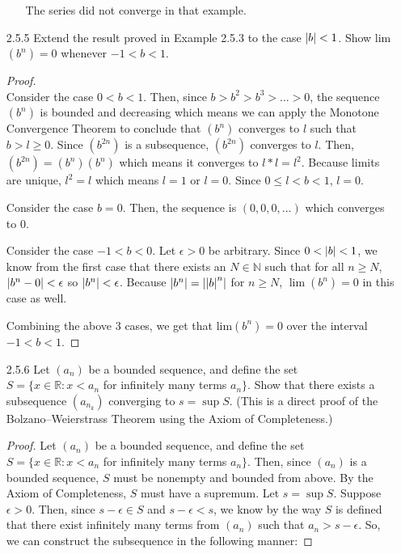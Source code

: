 \documentclass[12pt,letterpaper]{article}
\begin{document}
\begin{itemize}[leftmargin=!,labelindent=5pt]
\begin{itemize}
                The series did not converge in that example.
        \end{itemize}

    \item [2.5.5] Extend the result proved in Example 2.5.3 to the case $\abs{b} < 1$. Show lim$(b^n) = 0$ whenever $-1 < b < 1$.
        \begin{proof}\ \\
            Consider the case $0<b<1$.
            Then, since $b > b^2 > b^3 > ... > 0$, the sequence $(b^n)$ is bounded and decreasing which means we can apply the Monotone Convergence Theorem to conclude that $(b^n)$ converges to $l$ such that $b>l\geq 0$.
            Since $(b^{2n})$ is a subsequence, $(b^{2n})$ converges to $l$.
            Then, $(b^{2n}) = (b^n)(b^n)$ which means it converges to $l*l = l^2$.
            Because limits are unique, $l^2 = l$ which means $l = 1$ or $l=0$.
            Since $0 \leq l < b < 1$, $l = 0$.

            Consider the case $b = 0$.
            Then, the sequence is $(0,0, 0, ...)$ which converges to $0$.
            
            Consider the case $-1<b<0$.
            Let $\epsilon>0$ be arbitrary.
            Since $0<\abs{b} < 1$, we know from the first case that there exists an $N \in \mathbb{N}$ such that for all $n \geq N$, $\abs{b^n - 0} < \epsilon$ so $\abs{b^n} < \epsilon$. 
            Because $\abs{b^n} = \abs{\abs{b}^n}$ for $n \geq N$, $\lim(b^n) = 0$ in this case as well. 
            
            Combining the above 3 cases, we get that lim$(b^n) = 0$ over the interval $-1 < b < 1$.
        \end{proof}
    \item [2.5.6] Let $(a_n)$ be a bounded sequence, and define the set $S=\{x \in \mathbb{R}:x<a_n$ for infinitely many terms $a_n\}$. Show that there exists a subsequence $(a_{n_k})$ converging to $s = \sup S$. (This is a direct proof of the Bolzano–Weierstrass Theorem using the Axiom of Completeness.)
        \begin{proof}
            Let $(a_n)$ be a bounded sequence, and define the set $S=\{x \in \mathbb{R}:x<a_n$ for infinitely many terms $a_n\}$.
            Then, since $(a_n)$ is a bounded sequence, $S$ must be nonempty and bounded from above.
            By the Axiom of Completeness, $S$ must have a supremum.
            Let $s = \sup S$.
            Suppose $\epsilon > 0$.
            Then, since $s - \epsilon \in S$ and $s - \epsilon < s$, we know by the way $S$ is defined that there exist infinitely many terms from $(a_n)$ such that $a_n > s - \epsilon$.
            So, we can construct the subsequence in the following manner:


\end{proof}
\end{itemize}
\end{document}
